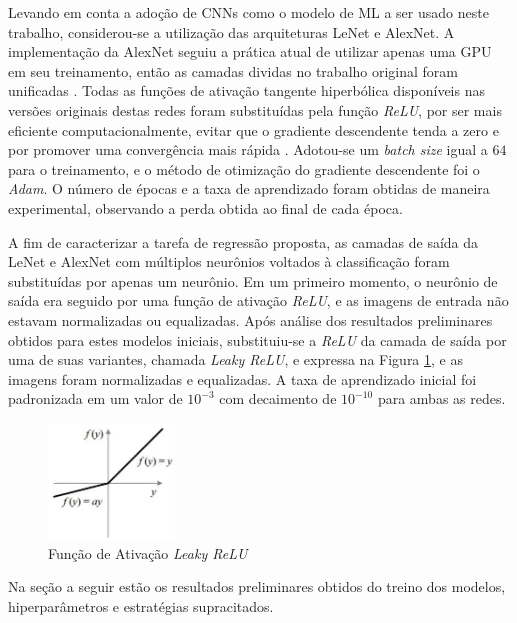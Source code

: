 Levando em conta a adoção de CNNs como o modelo de ML a ser usado neste trabalho, considerou-se a utilização das arquiteturas LeNet e AlexNet. A implementação da AlexNet seguiu a prática atual de utilizar apenas uma GPU em seu treinamento, então as camadas dividas no trabalho original foram unificadas \cite{tensorflow:alexnet}. Todas as funções de ativação tangente hiperbólica disponíveis nas versões originais destas redes foram substituídas pela função \emph{ReLU}, por ser mais eficiente computacionalmente, evitar que o gradiente descendente tenda a zero e por promover uma convergência mais rápida \cite{maas2013rectifier}. Adotou-se um \emph{batch size} igual a $64$ para o treinamento, e o método de otimização do gradiente descendente foi o \emph{Adam}. O número de épocas e a taxa de aprendizado foram obtidas de maneira experimental, observando a perda obtida ao final de cada época.

A fim de caracterizar a tarefa de regressão proposta, as camadas de saída da LeNet e AlexNet com múltiplos neurônios voltados à classificação foram substituídas por apenas um neurônio. Em um primeiro momento, o neurônio de saída era seguido por uma função de ativação \emph{ReLU}, e as imagens de entrada não estavam normalizadas ou equalizadas. Após análise dos resultados preliminares obtidos para estes modelos iniciais, substituiu-se a \emph{ReLU} da camada de saída por uma de suas variantes, chamada \emph{Leaky ReLU}, e expressa na Figura \ref{fig:lrelu}, e as imagens foram normalizadas e equalizadas. A taxa de aprendizado inicial foi padronizada em um valor de $10^{-3}$ com decaimento de $10^{-10}$ para ambas as redes.

\begin{figure}[!ht]
     \centering
     \includegraphics[width=0.3\textwidth]{img/lrelu}
     \caption{Função de Ativação \emph{Leaky ReLU}}
     \label{fig:lrelu}
\end{figure}

Na seção a seguir estão os resultados preliminares obtidos do treino dos modelos, hiperparâmetros e estratégias supracitados.
